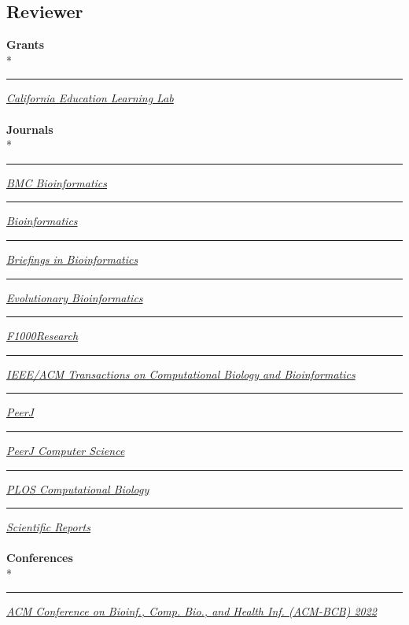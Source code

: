 \documentclass[margin,line]{res}
\begin{document}
\begin{resume}
\section{\sc Reviewer}
\textbf{Grants}\\*
\rule{-1mm}{5mm} \hspace*{4mm} \href{http://opr.ca.gov/learninglab/}{\textit{California Education Learning Lab}}\\
~\\
\textbf{Journals}\\*
\rule{-1mm}{5mm} \hspace*{4mm} \href{https://bmcbioinformatics.biomedcentral.com/}{\textit{BMC Bioinformatics}}\\
\rule{-1mm}{5mm} \hspace*{4mm} \href{https://academic.oup.com/bioinformatics}{\textit{Bioinformatics}}\\
\rule{-1mm}{5mm} \hspace*{4mm} \href{https://academic.oup.com/bib}{\textit{Briefings in Bioinformatics}}\\
\rule{-1mm}{5mm} \hspace*{4mm} \href{https://peerj.com/computer-science/}{\textit{Evolutionary Bioinformatics}}\\
\rule{-1mm}{5mm} \hspace*{4mm} \href{https://f1000research.com}{\textit{F1000Research}}\\
\rule{-1mm}{6mm} \hspace*{4mm} \href{https://ieeexplore.ieee.org/xpl/aboutJournal.jsp?punumber=8857}{\textit{IEEE/ACM Transactions on Computational Biology and Bioinformatics
}}\\
\rule{-1mm}{5mm} \hspace*{4mm} \href{https://peerj.com/}{\textit{PeerJ}}\\
\rule{-1mm}{5mm} \hspace*{4mm} \href{https://peerj.com/computer-science/}{\textit{PeerJ Computer Science}}\\
\rule{-1mm}{5mm} \hspace*{4mm} \href{https://journals.plos.org/ploscompbiol/}{\textit{PLOS Computational Biology}}\\
\rule{-1mm}{5mm} \hspace*{4mm} \href{https://www.nature.com/srep/}{\textit{Scientific Reports}}\\
~\\
\textbf{Conferences}\\*
\rule{-1mm}{5mm} \hspace*{4mm} \href{https://acm-bcb.org/2022}{\textit{ACM Conference on Bioinf., Comp. Bio., and Health Inf. (ACM-BCB) 2022}}\\

\end{resume}
\end{document}
